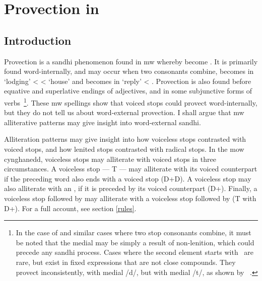 \chapter{Provection in }
\label{cha:prov-mwbe-y}
\section{Introduction}
\label{sec:introduction}
 Provection is a sandhi phenomenon found in \gls{mw} whereby  become .  It is primarily found word-internally, and
 may occur when two consonants combine, \eg {} becomes 
 in  `lodging' <  <  `house' and  becomes  in  `reply' < .
 Provection is also found before equative and superlative endings of
 adjectives, and in some subjunctive forms of
 verbs~\parencite[\S 17]{evans_grammar_1964}\footnote{In the case
   of  and similar cases where two stop consonants combine,
   it must be noted that the medial  may be simply a result of
   non-lenition, which could precede any sandhi process. Cases where
   the second element starts with \xD\ are rare, but exist in fixed
   expressions that are not close compounds. They provect
   inconsistently, \eg {} with
   medial /d/, but  with medial /t/, as
   shown by ~\autocite[s.v.\ \emph{rhad}]{bevan_geiriadur_2014}.}.
 These \gls{mw} spellings show that voiced stops could provect
 word-internally, but they do not tell us about word-external
 provection. I shall argue that \gls{mw} alliterative patterns may
 give insight into word-external sandhi.

 Alliteration patterns may give insight into how voiceless stops
 contrasted with voiced stops, and how lenited stops contrasted with
 radical stops. In the \gls{mow} cynghanedd, voiceless stops may
 alliterate with voiced stops in three circumstances. A voiceless stop
 --- \gls{T} --- may alliterate with its voiced counterpart if the
 preceding word also ends with a voiced stop (\gls{D}+\gls{D}). A
 voiceless stop may also alliterate with an , if it is preceded
 by its voiced counterpart (\gls{D}+). Finally, a voiceless stop
 followed by  may alliterate with a voiceless stop followed
 by  (\gls{T} with \gls{D}+). For a full account,
 see section \ref{rules}.

